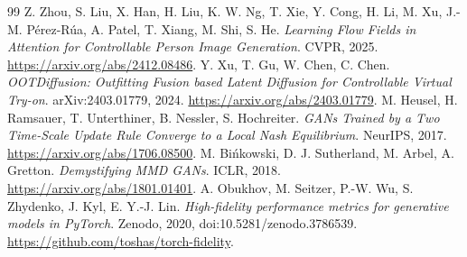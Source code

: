 \documentclass[11pt,a4paper]{article}
\begin{document}
\begin{thebibliography}{99}
 Z. Zhou, S. Liu, X. Han, H. Liu, K. W. Ng, T. Xie, Y. Cong, H. Li, M. Xu, J.-M. Pérez-Rúa, A. Patel, T. Xiang, M. Shi, S. He. \emph{Learning Flow Fields in Attention for Controllable Person Image Generation}. CVPR, 2025. \url{https://arxiv.org/abs/2412.08486}.
 Y. Xu, T. Gu, W. Chen, C. Chen. \emph{OOTDiffusion: Outfitting Fusion based Latent Diffusion for Controllable Virtual Try-on}. arXiv:2403.01779, 2024. \url{https://arxiv.org/abs/2403.01779}.
 M. Heusel, H. Ramsauer, T. Unterthiner, B. Nessler, S. Hochreiter. \emph{GANs Trained by a Two Time-Scale Update Rule Converge to a Local Nash Equilibrium}. NeurIPS, 2017. \url{https://arxiv.org/abs/1706.08500}.
 M. Bińkowski, D. J. Sutherland, M. Arbel, A. Gretton. \emph{Demystifying MMD GANs}. ICLR, 2018. \url{https://arxiv.org/abs/1801.01401}.
 A. Obukhov, M. Seitzer, P.-W. Wu, S. Zhydenko, J. Kyl, E. Y.-J. Lin. \emph{High-fidelity performance metrics for generative models in PyTorch}. Zenodo, 2020, doi:10.5281/zenodo.3786539. \url{https://github.com/toshas/torch-fidelity}.
\end{thebibliography}
\end{document}
